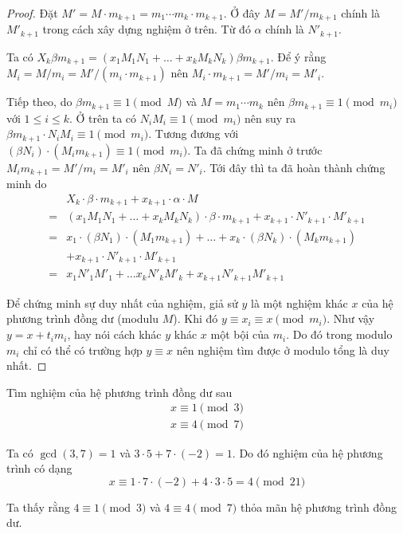 \begin{proof}
	Đặt $M' = M \cdot m_{k+1} = m_1 \cdots m_k \cdot m_{k+1}$. Ở đây $M = M' / m_{k+1}$ chính là $M'_{k+1}$ trong cách xây dựng nghiệm ở trên. Từ đó $\alpha$ chính là $N'_{k+1}$.
	
	Ta có $X_k \beta m_{k+1} = (x_1 M_1 N_1 + \ldots + x_k M_k N_k) \beta m_{k+1}$. Để ý rằng $M_i = M / m_i = M' / (m_i \cdot m_{k+1})$ nên $M_i \cdot m_{k+1} = M' / m_i = M'_i$. 
	
	Tiếp theo, do $\beta m_{k+1} \equiv 1 \pmod{M}$ và $M = m_1 \cdots m_k$ nên $\beta m_{k+1} \equiv 1 \pmod{m_i}$ với $1 \leqslant i \leqslant k$. Ở trên ta có $N_i M_i \equiv 1 \pmod{m_i}$ nên suy ra $\beta m_{k+1} \cdot N_i M_i \equiv 1 \pmod{m_i}$. Tương đương với $(\beta N_i) \cdot (M_i m_{k+1}) \equiv 1 \pmod{m_i}$. Ta đã chứng minh ở trước $M_i m_{k+1} = M'/m_i = M'_i$ nên $\beta N_i = N'_i$. Tới đây thì ta đã hoàn thành chứng minh do
	\begin{align*}
		& X_k \cdot \beta \cdot m_{k+1} + x_{k+1} \cdot \alpha \cdot M \\ 
        = & (x_1 M_1 N_1 + \ldots + x_k M_k N_k) \cdot \beta \cdot m_{k+1} + x_{k+1} \cdot N'_{k+1} \cdot M'_{k+1} \\ 
        = & x_1 \cdot (\beta N_1) \cdot (M_1 m_{k+1}) + \ldots + x_k \cdot (\beta N_k) \cdot (M_k m_{k+1}) \\ 
        & + x_{k+1} \cdot N'_{k+1} \cdot M'_{k+1} \\ 
        = & x_1 N'_1 M'_1 + \ldots x_k N'_k M'_k + x_{k+1} N'_{k+1} M'_{k+1}
	\end{align*}
	
	Để chứng minh sự duy nhất của nghiệm, giả sử $y$ là một nghiệm khác $x$ của hệ phương trình đồng dư (modulu $M$). Khi đó $y \equiv x_i \equiv x \pmod{m_i}$. Như vậy $y = x + t_i m_i$, hay nói cách khác $y$ khác $x$ một bội của $m_i$. Do đó trong modulo $m_i$ chỉ có thể có trường hợp $y \equiv x$ nên nghiệm tìm được ở modulo tổng là duy nhất.
\end{proof}

\begin{example}
	Tìm nghiệm của hệ phương trình đồng dư sau
	\begin{align*}
		x \equiv 1 \pmod 3 \\
		x \equiv 4 \pmod 7
	\end{align*}
	
	Ta có $\gcd(3, 7) = 1$ và $3 \cdot 5 + 7 \cdot (-2) = 1$. Do đó nghiệm của hệ phương trình có dạng 
	\[x \equiv 1 \cdot 7 \cdot (-2) + 4 \cdot 3 \cdot 5 = 4 \pmod{21}\]
	
	Ta thấy rằng $4 \equiv 1 \pmod 3$ và $4 \equiv 4 \pmod 7$ thỏa mãn hệ phương trình đồng dư.
\end{example}